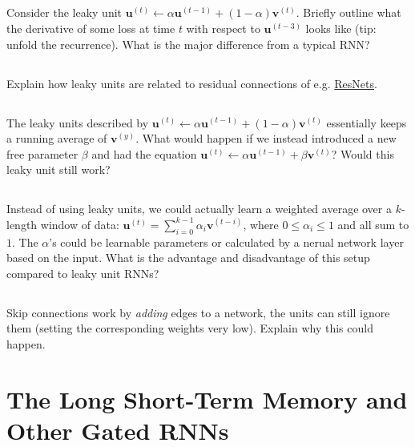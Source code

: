 \documentclass[a4paper]{report} \usepackage{amsmath}
\renewcommand{\vec}[1]{{\boldsymbol{#1}}}
\newcommand{\tvec}[2]{{\vec{#1}^{(#2)}}}
\begin{document}
    \subsection{}
    Consider the leaky unit $\tvec{u}{t} \leftarrow \alpha
    \tvec{u}{t-1} + (1-\alpha)\tvec{v}{t}$. Briefly outline what the
    derivative of some loss at time $t$ with respect to
    $\tvec{u}{t-3}$ looks like (tip: unfold the recurrence). What is
    the major difference from a typical RNN?

    \subsection{}
    Explain how leaky units are related to residual connections of
    e.g. \href{https://arxiv.org/abs/1512.03385}{ResNets}.

    \subsection{}
    The leaky units described by $\tvec{u}{t} \leftarrow \alpha
    \tvec{u}{t-1} + (1-\alpha)\tvec{v}{t}$ essentially keeps a running
    average of $\tvec{v}{y}$. What would happen if we instead
    introduced a new free parameter $\beta$ and had the equation
    $\tvec{u}{t} \leftarrow \alpha \tvec{u}{t-1} + \beta\tvec{v}{t}$?
    Would this leaky unit still work?

    \subsection{}
    Instead of using leaky units, we could actually learn a weighted
    average over a $k$-length window of data: $\tvec{u}{t} =
    \sum_{i=0}^{k-1} \alpha_i \tvec{v}{t-i}$, where $0 \leq \alpha_i
    \leq 1$ and all sum to $1$. The $\alpha$'s could be learnable
    parameters or calculated by a nerual network layer based on the
    input. What is the advantage and disadvantage of this setup
    compared to leaky unit RNNs?

    \subsection{}
    Skip connections work by \emph{adding} edges to a network, the
    units can still ignore them (setting the corresponding weights
    very low). Explain why this could happen.

    \section{The Long Short-Term Memory and Other Gated RNNs}
\end{document}

